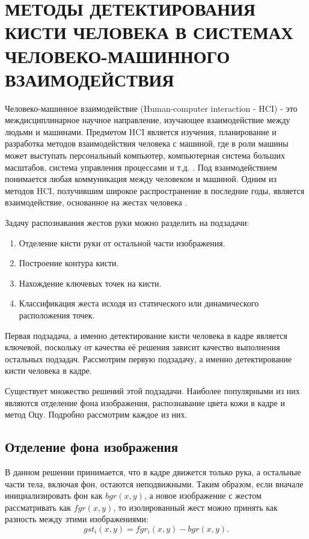\section{\centering\nohyphens{МЕТОДЫ ДЕТЕКТИРОВАНИЯ КИСТИ ЧЕЛОВЕКА В СИСТЕМАХ ЧЕЛОВЕКО-МАШИННОГО ВЗАИМОДЕЙСТВИЯ}}

Человеко-машинное взаимодействие (Human-computer interaction - HCI) - это междисциплинарное
научное направление, изучающее взаимодействие между людьми и машинами. Предметом HCI является
изучения, планирование и разработка методов взаимодействия человека с машиной, где в роли машины
может выступать персональный компьютер, компьютерная система больших масштабов, система 
управления процессами и т.д. \cite{dix}. Под взаимодействием понимается любая коммуникация между
человеком и машиной. Одним из методов HCI, получившим широкое распространение в последние годы,
является взаимодействие, основанное на жестах человека \cite{jiangqin, sanna}. 

Задачу распознавания жестов руки можно разделить на подзадачи:
\begin{enumerate}
	\item Отделение кисти руки от остальной части изображения.
	\item Построение контура кисти.
	\item Нахождение ключевых точек на кисти.
	\item Классификация жеста исходя из статического или динамического расположения точек.
\end{enumerate}

Первая подзадача, а именно детектирование кисти человека в кадре является ключевой, поскольку
от качества её решения зависит качество выполнения остальных подзадач.
Рассмотрим первую подзадачу, а именно детектирование кисти человека в кадре.

Существует множество решений этой подзадачи. Наиболее популярными из них являются 
отделение фона изображения, распознавание цвета 
кожи в кадре и метод Оцу. 
Подробно рассмотрим каждое из них.

\subsection{Отделение фона изображения}

В данном решении принимается, что в кадре движется только рука, а остальные части
тела, включая фон, остаются неподвижными. Таким образом, если вначале инициализировать фон как
$bgr(x, y)$, а новое изображение с жестом рассматривать как $fgr(x, y)$, то изолированный жест
можно принять как разность между этими изображениями: 
\begin{equation} gst_i(x,y)=fgr_i(x,y)-bgr(x,y). \label{first}\end{equation}

